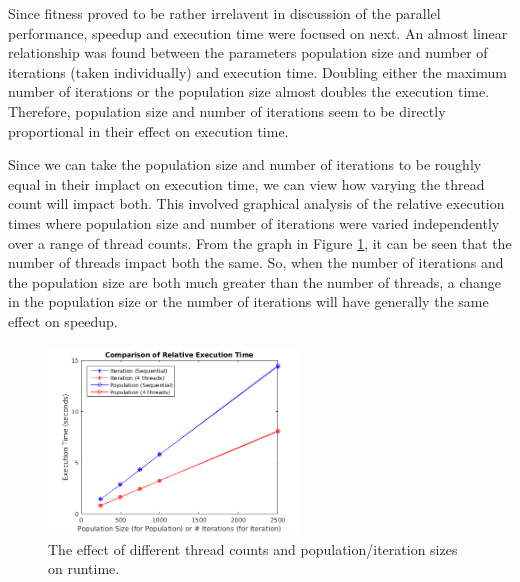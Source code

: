 \documentclass[10pt,letterpaper]{article}
\begin{document}
Since fitness proved to be rather irrelavent in discussion of the parallel performance, speedup and execution time were focused on next. An almost linear relationship was found between the parameters population size and number of iterations (taken individually) and execution time. Doubling either the maximum number of iterations or the population size almost doubles the execution time. Therefore, population size and number of iterations seem to be directly proportional in their effect on execution time.

Since we can take the population size and number of iterations to be roughly equal in their implact on execution time, we can view how varying the thread count will impact both. This involved graphical analysis of the relative execution times where population size and number of iterations were varied independently over a range of thread counts. From the graph in Figure \ref{fig:itervspop}, it can be seen that the number of threads impact both the same. So, when the number of iterations and the population size are both much greater than the number of threads, a change in the population size or the number of iterations will have generally the same effect on speedup.

\begin{figure}
\centering
\includegraphics[width=0.6\textwidth]{../img/Lenovo_Compare_ItervsPop.png} 
\caption{The effect of different thread counts and population/iteration sizes on runtime.}
\label{fig:itervspop}
\end{figure}
\end{document}
